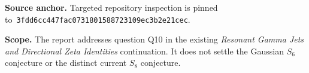 \documentclass[11pt]{article}
\numberwithin{equation}{section}
\theoremstyle{definition}\newtheorem{definition}[theorem]{Definition}
\theoremstyle{remark}\newtheorem{remark}[theorem]{Remark}\newtheorem{example}[theorem]{Example}
\newcommand{\pin}{\texttt{3fdd6cc447fac0731801588723109ec3b2e21cec}}
\begin{document}
\begin{titlepage}
\begin{abstract}
All theorem statements have ordinary analytic or algebraic proofs. Exact finite
regression tests and independent high-precision diagnostics are supplied separately.
The first multiplicative anomaly and the classical special-function ingredients retain
their attribution. No claim of worldwide priority, arithmetic independence, or
proof-assistant formalization is made.
\end{abstract}
\vfill
\begin{minipage}{.94\textwidth}\small\raggedright
\textbf{Source anchor.} Targeted repository inspection is pinned to\
\pin.\par
\textbf{Scope.} The report addresses question Q10 in the existing
\emph{Resonant Gamma Jets and Directional Zeta Identities} continuation. It does not settle the Gaussian
$S_6$ conjecture or the distinct current $S_8$ conjecture.
\end{minipage}
\end{titlepage}
\begingroup
\small
\setlength{\parskip}{0pt}
\tableofcontents
\endgroup
\clearpage










\clearpage

\end{document}
